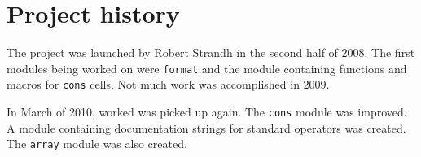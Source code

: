 \chapter{Project history}

The project was launched by Robert Strandh in the second half of 2008.
The first modules being worked on were \texttt{format} and the module
containing functions and macros for \texttt{cons} cells.  Not much
work was accomplished in 2009.

In March of 2010, worked was picked up again.  The \texttt{cons}
module was improved.  A module containing documentation strings for
standard operators was created.  The \texttt{array} module was also
created.

